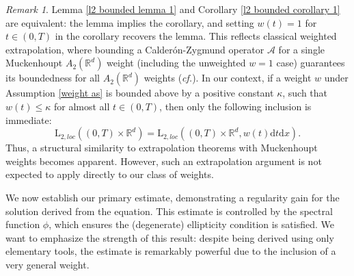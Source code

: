 \documentclass[11pt,reqno]{amsart}
\theoremstyle{definition}
\theoremstyle{remark}
\newtheorem{rem}[thm]{Remark}
\newcommand\bR{\mathbb{R}}
\newcommand\cA{\mathcal{A}}
\numberwithin{equation}{section}
\begin{document}
\begin{rem}
										\label{extra weight rem}
Lemma \ref{l2 bounded lemma 1} and Corollary \ref{l2 bounded corollary 1} are equivalent: the lemma implies the corollary, and setting $w(t)=1$ for $t \in (0,T)$ in the corollary recovers the lemma. 
This reflects classical weighted extrapolation, where bounding a Calderón-Zygmund operator $\cA$ for a single Muckenhoupt $A_2(\bR^d)$ weight (including the unweighted $w=1$ case) guarantees its boundedness for all $A_2(\bR^d)$ weights (\textit{cf.}\cite{Hy1,GR1,CMP1}).
In our context, if a weight $w$ under Assumption \ref{weight as} is bounded above by a positive constant $\kappa$, such that $w(t) \leq \kappa$ for almost all $t \in (0,T)$, then only the following inclusion is immediate:
$$
\mathrm{L}_{2,loc}\left( (0,T) \times \bR^d \right)
= \mathrm{L}_{2,loc}\left( (0,T) \times \bR^d, w(t)\mathrm{d}t\mathrm{d}x \right).
$$
Thus, a structural similarity to extrapolation theorems with Muckenhoupt weights becomes apparent. 
However, such an extrapolation argument is not expected to apply directly to our class of weights.
\end{rem}

We now establish our primary estimate, demonstrating a regularity gain for the solution derived from the equation. 
This estimate is controlled by the spectral function $\phi$, which ensures the (degenerate) ellipticity condition is satisfied. 
We want to emphasize the strength of this result: despite being derived using only elementary tools, the estimate is remarkably powerful due to the inclusion of a very general weight.
\end{document}
